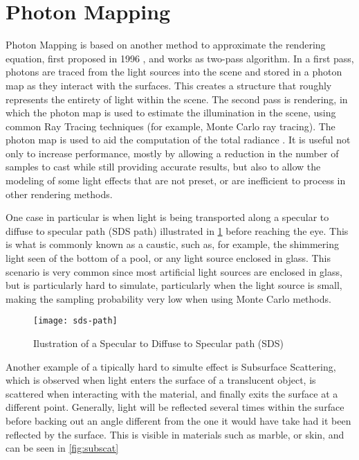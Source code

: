\documentclass[main.tex]{subfiles}
\begin{document}
\section{Photon Mapping}

Photon Mapping is based on another method to approximate the rendering equation, first proposed in 1996 \cite{jensen1996global}, and works as two-pass algorithm. In a first pass, photons are traced from the light sources into the scene and stored in a photon map as they interact with the surfaces. This creates a structure that roughly represents the entirety of light within the scene. The second pass is rendering, in which the photon map is used to estimate the illumination in the scene, using common Ray Tracing techniques (for example, Monte Carlo ray tracing). The photon map is used to aid the computation of the total radiance . It is useful not only to increase performance, mostly by allowing a reduction in the number of samples to cast while still providing accurate results, but also to allow the modeling of some light effects that are not preset, or are inefficient to process in other rendering methods.

One case in particular is when light is being transported along a specular to diffuse to specular path (SDS path) illustrated in \cref{fig:sdspath} before reaching the eye. This is what is commonly known as a caustic, such as, for example, the shimmering light seen of the bottom of a pool, or any light source enclosed in glass. This scenario is very common since most artificial light sources are enclosed in glass, but is particularly hard to simulate, particularly when the light source is small, making the sampling probability very low when using Monte Carlo methods.

\begin{figure}[!htp]
  \centering
  \texttt{[image: sds-path]}
  \caption{Ilustration of a Specular to Diffuse to Specular path (SDS) \label{fig:sdspath}}
\end{figure}

Another example of a tipically hard to simulte effect is Subsurface Scattering, which is observed when light enters the surface of a translucent object, is scattered when interacting with the material, and finally exits the surface at a different point. Generally, light will be reflected several times within the surface before backing out an angle different from the one it would have take had it been reflected by the surface. This is visible in materials such as marble, or skin, and can be seen in \cref{fig:subscat}
\end{document}
